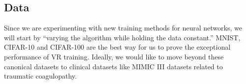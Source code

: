 \documentclass{article} %
\begin{document}




\subsection{Data}
Since we are experimenting with new training methods for neural networks, we will start by ``varying the algorithm while holding the data constant.'' MNIST, CIFAR-10 and CIFAR-100 are the best way for us to prove the exceptional performance of VR training. Ideally, we would like to move beyond these canonical datasets to clinical datasets like MIMIC III \cite{mimiciii} datasets related to traumatic coagulopathy.
\end{document}
